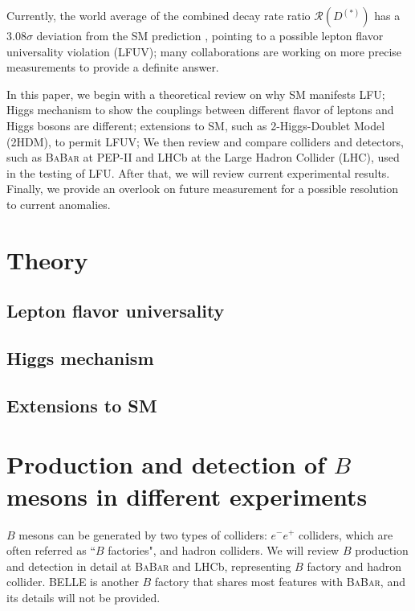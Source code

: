\documentclass[12pt,letterpaper]{article}
\def\BaBar/{\textsc{BaBar}}
\def\RDDst/{\ensuremath{\mathcal{R}(D^{(*)})}}
\begin{document}
Currently, the world average of the combined decay rate ratio \RDDst/
has a $3.08\sigma$ deviation from the SM prediction \cite{HFLAV:2019}, pointing
to a possible lepton flavor universality violation (LFUV);
many collaborations are working on more precise measurements to provide a
definite answer.

In this paper, we begin with a theoretical review on why SM manifests LFU;
Higgs mechanism to show the couplings between different flavor of leptons and
Higgs bosons are different;
extensions to SM, such as 2-Higgs-Doublet Model (2HDM), to permit LFUV;
We then review and compare colliders and detectors, such as \BaBar/ at PEP-II
and LHCb at the Large Hadron Collider (LHC), used in the testing of LFU.
After that, we will review current experimental results.
Finally, we provide an overlook on future measurement for a possible resolution
to current anomalies.

\section{Theory}
\subsection{Lepton flavor universality} \label{sec:lfu}


\subsection{Higgs mechanism}


\subsection{Extensions to SM}


\section{Production and detection of $B$ mesons in different experiments}
$B$ mesons can be generated by two types of colliders:
$e^- e^+$ colliders, which are often referred as ``$B$ factories", and hadron
colliders.
We will review $B$ production and detection in detail at \BaBar/ and LHCb,
representing $B$ factory and hadron collider.
BELLE is another $B$ factory that shares most features with \BaBar/, and its
details will not be provided.
\end{document}
